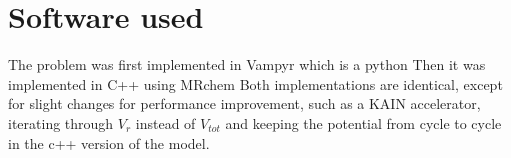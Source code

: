 \documentclass[../master_thesis.tex]{subfiles}
\begin{document}
\section{Software used}
The problem was first implemented in Vampyr %
which is a python %
Then it was implemented in C++ using MRchem %
Both implementations are identical, except for slight changes for
performance improvement, such as a KAIN accelerator, %
iterating through $V_r$ instead of $V_{tot}$ %
and keeping the potential from cycle to cycle
in the c++ version of the model.



\biblio
\end{document}
